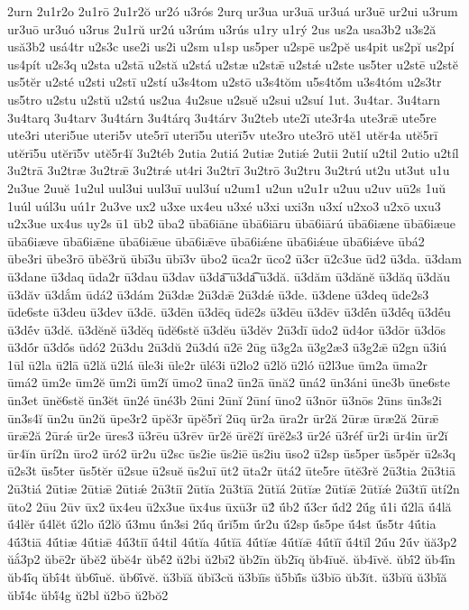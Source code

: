 {2urn
2u1r2o
2u1rō
2u1r2ŏ
ur2ó
u3rós
2urq
ur3ua
ur3uā
ur3uá
ur3uē
ur2ui
u3rum
ur3uō
ur3uó
u3rus
2u1rŭ
ur2ú
u3rúm
u3rús
u1ry
u1rý
2us
us2a
usa3b2
u3s2ă
usă3b2
usá4tr
u2s3c
use2i
us2i
u2sm
u1sp
us5per
u2spē
us2pĕ
us4pit
us2pĭ
us2pí
us4pít
u2s3q
u2sta
u2stā
u2stă
u2stá
u2stæ
u2stǣ
u2stǽ
u2ste
us5ter
u2stē
u2stĕ
us5tĕr
u2sté
u2sti
u2stī
u2stí
u3s4tom
u2stō
u3s4tŏm
u5s4tŏ́m
u3s4tóm
u2s3tr
us5tro
u2stu
u2stŭ
u2stú
us2ua
4u2sue
u2suĕ
u2sui
u2suí
1ut.
3u4tar.
3u4tarn
3u4tarq
3u4tarv
3u4tárn
3u4tárq
3u4tárv
3u2teb
ute2ī
ute3r4a
ute3rǣ
ute5re
ute3ri
uteri5ue
uteri5v
ute5rī
uterī5u
uterī5v
ute3ro
ute3rō
utĕ1
utĕr4a
utĕ5rī
utĕrī5u
utĕrī5v
utĕ5r4ĭ
3u2téb
2utia
2utiá
2utiæ
2utiǽ
2utii
2utií
u2til
2utio
u2tíl
3u2trā
3u2træ
3u2trǣ
3u2trǽ
ut4ri
3u2trī
3u2trō
3u2tru
3u2trú
ut2u
ut3ut
u1u
2u3ue
2uuĕ
1u2ul
uul3ui
uul3uī
uul3uí
u2um1
u2un
u2u1r
u2uu
u2uv
uū2s
1uŭ
1uúl
uúl3u
uú1r
2u3ve
ux2
u3xe
ux4eu
u3xé
u3xi
uxi3n
u3xí
u2xo3
u2xō
uxu3
u2x3ue
ux4us
uy2s
ū1
ūb2
ūba2
ūbā6iāne
ūbā6iāru
ūbā6iārú
ūbā6iæne
ūbā6iæue
ūbā6iæve
ūbā6iǣne
ūbā6iǣue
ūbā6iǣve
ūbā6iǽne
ūbā6iǽue
ūbā6iǽve
ūbá2
ūbe3ri
ūbe3rō
ūbĕ3rŭ
ūbī3u
ūbī3v
ūbo2
ūca2r
ūco2
ū3cr
ū2c3ue
ūd2
ū3da.
ū3dam
ū3dane
ū3daq
ūda2r
ū3dau
ū3dav
ū3da͞
ū3da͡
ū3dă.
ū3dăm
ū3dănĕ
ū3dăq
ū3dău
ū3dăv
ū3dắm
ūdá2
ū3dám
2ū3dæ
2ū3dǣ
2ū3dǽ
ū3de.
ū3dene
ū3deq
ūde2s3
ūde6ste
ū3deu
ū3dev
ū3dē.
ū3dēn
ū3dēq
ūdē2s
ū3dēu
ū3dēv
ū3dḗn
ū3dḗq
ū3dḗu
ū3dḗv
ū3dĕ.
ū3dĕnĕ
ū3dĕq
ūdĕ6stĕ
ū3dĕu
ū3dĕv
2ū3dī
ūdo2
ūd4or
ū3dōr
ū3dōs
ū3dṓr
ū3dṓs
ūdó2
2ū3du
2ū3dŭ
2ū3dú
ū2ē
2ūg
ū3g2a
ū3g2æ3
ū3g2ǣ
ū2gn
ū3iú
1ūl
ū2la
ū2lā
ū2lă
ū2lá
ūle3i
ūle2r
ūlé3i
ū2lo2
ū2lŏ
ū2ló
ū2l3ue
ūm2a
ūma2r
ūmá2
ūm2e
ūm2ĕ
ūm2i
ūm2ĭ
ūmo2
ūna2
ūn2ā
ūnă2
ūná2
ūn3áni
ūne3b
ūne6ste
ūn3et
ūnĕ6stĕ
ūn3ĕt
ūn2é
ūné3b
2ūni
2ūnĭ
2ūní
ūno2
ū3nōr
ū3nōs
2ūns
ūn3s2i
ūn3s4ĭ
ūn2u
ūn2ŭ
ūpe3r2
ūpĕ3r
ūpĕ5rĭ
2ūq
ūr2a
ūra2r
ūr2ă
2ūræ
ūræ2ă
2ūrǣ
ūrǣ2ă
2ūrǽ
ūr2e
ūres3
ū3rēu
ū3rēv
ūr2ĕ
ūrĕ2ĭ
ūrĕ2s3
ūr2é
ū3réf
ūr2i
ūr4in
ūr2ĭ
ūr4ĭn
ūrí2n
ūro2
ūró2
ūr2u
ū2sc
ūs2ie
ūs2iē
ūs2iu
ūso2
ū2sp
ūs5per
ūs5pĕr
ū2s3q
ū2s3t
ūs5ter
ūs5tĕr
ū2sue
ū2suĕ
ūs2uī
ūt2
ūta2r
ūtá2
ūte5re
ūtĕ3rĕ
2ū3tia
2ū3tiā
2ū3tiá
2ūtiæ
2ūtiǣ
2ūtiǽ
2ū3tiī
2ūtĭa
2ū3tĭā
2ūtĭá
2ūtĭæ
2ūtĭǣ
2ūtĭǽ
2ū3tĭī
ūtí2n
ūto2
2ūu
2ūv
ūx2
ūx4eu
ū2x3ue
ūx4us
ūxū3r
ū2́
ū́b2
ū́3cr
ū́d2
2ū́g
ū́1i
ū́2lā
ū́4lă
ū́4lĕr
ū́4lĕt
ū́2lo
ū́2lŏ
ū́3mu
ū́n3si
2ū́q
ū́rĭ5m
ū́r2u
ū́2sp
ū́s5pe
ū́4st
ū́s5tr
4ū́tia
4ū́3tiā
4ū́tiæ
4ū́tiǣ
4ū́3tiī
ū́4til
4ū́tĭa
4ū́tĭā
4ū́tĭæ
4ū́tĭǣ
4ū́tĭī
ū́4tĭl
2ū́u
2ū́v
ŭă3p2
ŭắ3p2
ŭbē2r
ŭbĕ2
ŭbĕ4r
ŭbĕ́2
ŭ2bi
ŭ2bī2
ŭb2īn
ŭb2īq
ŭb4īuĕ.
ŭb4īvĕ.
ŭbī́2
ŭb4ī́n
ŭb4ī́q
ŭbī́4t
ŭb6ī́uĕ.
ŭb6ī́vĕ.
ŭ3bĭă
ŭbĭ3cŭ
ŭ3bĭīs
ŭ5bĭī́s
ŭ3bĭō
ŭb3ĭt.
ŭ3bĭŭ
ŭ3bĭ́ă
ŭbĭ́4c
ŭbĭ́4g
ŭ2bl
ŭ2bō
ŭ2bŏ2
}
